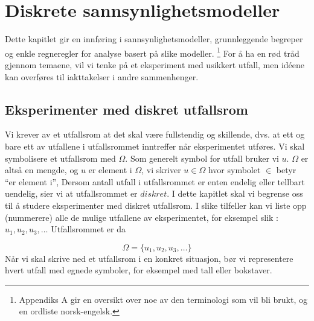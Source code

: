 \chapter{Diskrete sannsynlighetsmodeller}
\label{kap:diskrete} %


Dette kapitlet gir en innføring i sannsynlighetsmodeller,
grunnleggende begreper og enkle regneregler for analyse basert på slike
 modeller.
\footnote{Appendiks  A gir en oversikt over noe av den
terminologi som vil bli brukt, og en ordliste norsk-engelsk.} 
For å ha en rød tråd gjennom temaene, vil vi tenke på et 
eksperiment med usikkert utfall, men id\'{e}ene kan overføres til
iakttakelser i andre sammenhenger.

\section{Eksperimenter med diskret utfallsrom}

\begin{center}  \end{center}

\noindent Vi krever av et utfallsrom at det skal være fullstendig og
skillende, dvs. at ett og bare ett av utfallene i utfallsrommet
inntreffer når eksperimentet utføres. Vi skal symbolisere et
utfallsrom med $\Omega$. Som generelt symbol for utfall bruker vi $u$.
 $\Omega$ er altså en mengde, og $u$ er element i $\Omega$, vi skriver
$u \in \Omega$ hvor symbolet $\in$ betyr ``er element i'',
Dersom antall utfall i utfallsrommet er enten endelig
eller tellbart uendelig, sier vi at utfallsrommet er $diskret$. I
dette kapitlet skal vi begrense oss til å studere eksperimenter
med diskret utfallsrom. I slike tilfeller kan vi liste opp
(nummerere) alle de mulige utfallene av eksperimentet, for
eksempel slik : $u_1, u_2, u_3,\ldots$
Utfallsrommet er da 

\[                      \Omega=\{u_1, u_2, u_3,\ldots\} \]
Når vi skal skrive ned et utfallsrom i en konkret situasjon, bør
vi representere hvert utfall med egnede symboler, for eksempel
med tall eller bokstaver. \\

